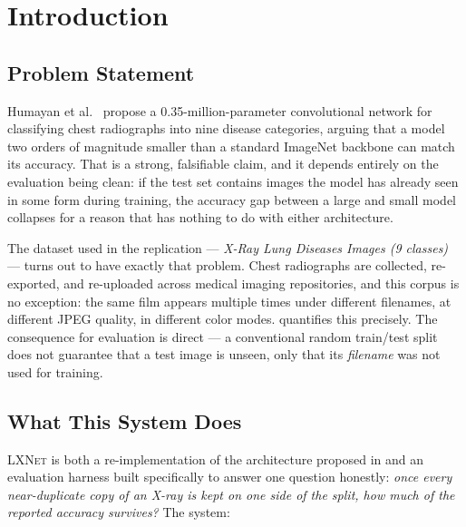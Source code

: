 \documentclass[11pt,a4paper,oneside]{report}
\newcommand{\LXNet}{\textsc{LXNet}}
\begin{document}
\clearpage
{}

\chapter{Introduction}
\label{ch:intro}

\section{Problem Statement}

Humayan et al.\ \cite{humayan2026} propose a 0.35-million-parameter
convolutional network for classifying chest radiographs into nine disease
categories, arguing that a model two orders of magnitude smaller than a
standard ImageNet backbone can match its accuracy. That is a strong,
falsifiable claim, and it depends entirely on the evaluation being clean: if
the test set contains images the model has already seen in some form during
training, the accuracy gap between a large and small model collapses for a
reason that has nothing to do with either architecture.

The dataset used in the replication --- \emph{X-Ray Lung Diseases Images (9
classes)} \cite{kaggle-dataset} --- turns out to have exactly that problem.
Chest radiographs are collected, re-exported, and re-uploaded across medical
imaging repositories, and this corpus is no exception: the same film appears
multiple times under different filenames, at different JPEG quality, in
different color modes.  quantifies this precisely. The
consequence for evaluation is direct --- a conventional random train/test
split does not guarantee that a test image is unseen, only that its
\emph{filename} was not used for training.

\section{What This System Does}

\LXNet{} is both a re-implementation of the architecture proposed in
\cite{humayan2026} and an evaluation harness built specifically to answer one
question honestly: \emph{once every near-duplicate copy of an X-ray is kept
on one side of the split, how much of the reported accuracy survives?} The
system:
\end{document}

